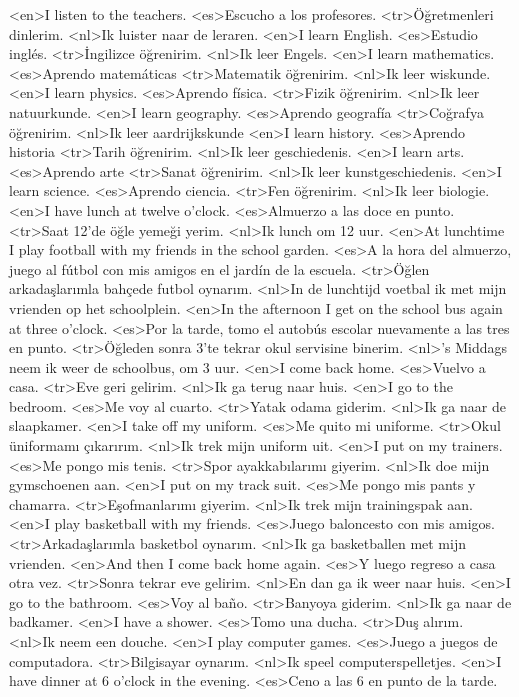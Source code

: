 <en>I listen to the teachers.
<es>Escucho a los profesores.
<tr>Öğretmenleri dinlerim.
<nl>Ik luister naar de leraren.
<en>I learn English.
<es>Estudio inglés.
<tr>İngilizce öğrenirim.
<nl>Ik leer Engels.
<en>I learn mathematics.
<es>Aprendo matemáticas
<tr>Matematik öğrenirim.
<nl>Ik leer wiskunde.
<en>I learn physics.
<es>Aprendo física.
<tr>Fizik öğrenirim.
<nl>Ik leer natuurkunde.
<en>I learn geography.
<es>Aprendo geografía
<tr>Coğrafya öğrenirim.
<nl>Ik leer aardrijkskunde
<en>I learn history.
<es>Aprendo historia
<tr>Tarih öğrenirim.
<nl>Ik leer geschiedenis.
<en>I learn arts.
<es>Aprendo arte
<tr>Sanat öğrenirim.
<nl>Ik leer kunstgeschiedenis.
<en>I learn science.
<es>Aprendo ciencia.
<tr>Fen öğrenirim.
<nl>Ik leer biologie.
<en>I have lunch at twelve o’clock.
<es>Almuerzo a las doce en punto.
<tr>Saat 12’de öğle yemeği yerim.
<nl>Ik lunch om 12 uur.
<en>At lunchtime I play football with my friends in the school garden.
<es>A la hora del almuerzo, juego al fútbol con mis amigos en el jardín de la escuela.
<tr>Öğlen arkadaşlarımla bahçede futbol oynarım.
<nl>In de lunchtijd voetbal ik met mijn vrienden op het schoolplein.  
<en>In the afternoon I get on the school bus again at three o’clock.
<es>Por la tarde, tomo el autobús escolar nuevamente a las tres en punto.
<tr>Öğleden sonra 3'te tekrar okul servisine binerim.
<nl>'s Middags neem ik weer de schoolbus, om 3 uur.
<en>I come back home.
<es>Vuelvo a casa.
<tr>Eve geri gelirim.
<nl>Ik ga terug naar huis.
<en>I go to the bedroom.
<es>Me voy al cuarto.
<tr>Yatak odama giderim.
<nl>Ik ga naar de slaapkamer.
<en>I take off my uniform.
<es>Me quito mi uniforme.
<tr>Okul üniformamı çıkarırım.
<nl>Ik trek mijn uniform uit.
<en>I put on my trainers.
<es>Me pongo mis tenis.
<tr>Spor ayakkabılarımı giyerim.
<nl>Ik doe mijn gymschoenen aan.
<en>I put on my track suit.
<es>Me pongo mis pants y chamarra.
<tr>Eşofmanlarımı giyerim.
<nl>Ik trek mijn trainingspak aan.
<en>I play basketball with my friends.
<es>Juego baloncesto con mis amigos.
<tr>Arkadaşlarımla basketbol oynarım.
<nl>Ik ga basketballen met mijn vrienden.
<en>And then I come back home again.
<es>Y luego regreso a casa otra vez.
<tr>Sonra tekrar eve gelirim.
<nl>En dan ga ik weer naar huis.
<en>I go to the bathroom.
<es>Voy al baño.
<tr>Banyoya giderim.
<nl>Ik ga naar de badkamer.
<en>I have a shower.
<es>Tomo una ducha.
<tr>Duş alırım.
<nl>Ik neem een douche.
<en>I play computer games.
<es>Juego a juegos de computadora.
<tr>Bilgisayar oynarım.
<nl>Ik speel computerspelletjes.
<en>I have dinner at 6 o’clock in the evening.
<es>Ceno a las 6 en punto de la tarde.
